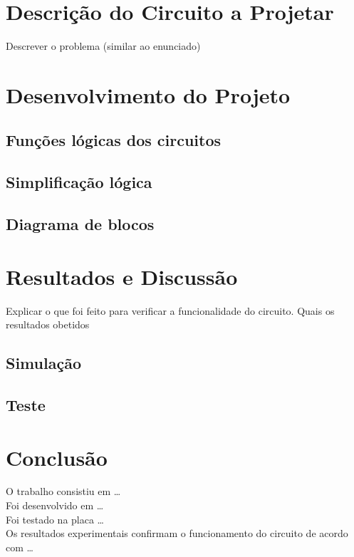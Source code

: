 \documentclass[12pt]{article}
\begin{document}
\section{Descrição do Circuito a Projetar}
Descrever o problema (similar ao enunciado)

\section{Desenvolvimento do Projeto}
\subsection{Funções lógicas dos circuitos}

\subsection{Simplificação lógica}


\subsection{Diagrama de blocos}


\section{Resultados e Discussão}
Explicar o que foi feito para verificar a funcionalidade do circuito. Quais os resultados obetidos

\subsection{Simulação}

\subsection{Teste}

\section{Conclusão} 
O trabalho consistiu em … \\
Foi desenvolvido em … \\ 
Foi testado na placa …\\
Os resultados experimentais confirmam o funcionamento do circuito de acordo com …


\newpage
\end{document}

